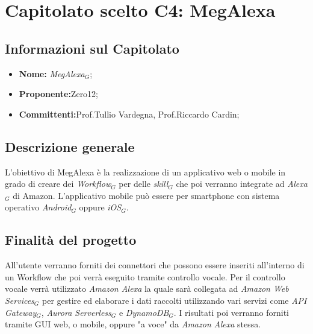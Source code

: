 
\chapter{Capitolato scelto C4: MegAlexa}
\section{Informazioni sul Capitolato}
\begin{itemize}
 \item \textbf{Nome:} \textit{MegAlexa$_{G}$};
\item \textbf{Proponente:}Zero12;
\item \textbf{Committenti:}Prof.Tullio Vardegna, Prof.Riccardo Cardin;
\end{itemize}

\section{Descrizione generale}
L'obiettivo di MegAlexa è la  realizzazione di un applicativo web o mobile in grado di creare dei \textit{Workflow$_{G}$} per delle \textit{skill$_{G}$} che poi verranno integrate ad \textit{Alexa$_{G}$} di Amazon.
L'applicativo mobile può essere per smartphone con sistema operativo \textit{Android$_{G}$} oppure \textit{iOS$_{G}$}.
\section{Finalit\`a del progetto}
All'utente verranno forniti dei connettori che possono essere inseriti all'interno di un Workflow che poi verrà eseguito tramite controllo vocale.  
Per il controllo vocale verrà utilizzato \emph{Amazon Alexa} la quale sarà collegata ad \textit{Amazon Web Services$_{G}$} per gestire ed elaborare i dati raccolti utilizzando vari servizi come \textit{API Gateway$_{G}$}, \textit{Aurora Serverless$_{G}$} e \textit{DynamoDB$_{G}$}.
I risultati poi verranno forniti tramite GUI web, o mobile, oppure "a voce" da \emph{Amazon Alexa} stessa.
